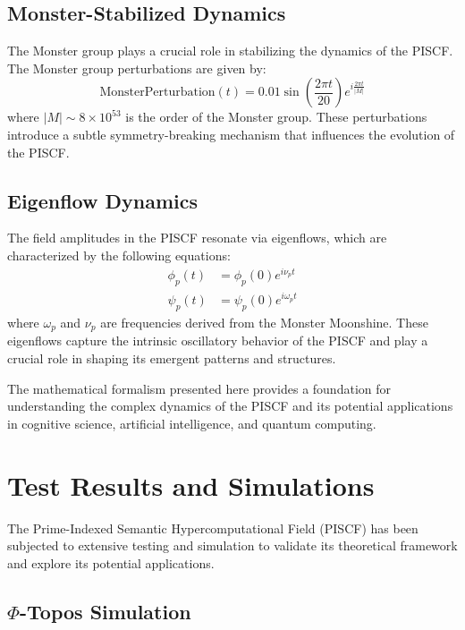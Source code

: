 \documentclass{article}
\theoremstyle{plain}
\begin{document}
\subsection{Monster-Stabilized Dynamics}

The Monster group plays a crucial role in stabilizing the dynamics of the PISCF. The Monster group perturbations are given by:
\begin{equation}
\text{MonsterPerturbation}(t) = 0.01 \sin\left( \frac{2\pi t}{20} \right) e^{i \frac{2\pi t}{|M|}}
\end{equation}
where $|M| \sim 8 \times 10^{53}$ is the order of the Monster group. These perturbations introduce a subtle symmetry-breaking mechanism that influences the evolution of the PISCF.

\subsection{Eigenflow Dynamics}

The field amplitudes in the PISCF resonate via eigenflows, which are characterized by the following equations:
\begin{align}
\phi_p(t) &= \phi_{p}(0) e^{i \nu_p t} \\
\psi_p(t) &= \psi_p(0) e^{i \omega_p t}
\end{align}
where $\omega_p$ and $\nu_p$ are frequencies derived from the Monster Moonshine. These eigenflows capture the intrinsic oscillatory behavior of the PISCF and play a crucial role in shaping its emergent patterns and structures.

The mathematical formalism presented here provides a foundation for understanding the complex dynamics of the PISCF and its potential applications in cognitive science, artificial intelligence, and quantum computing.

\section{Test Results and Simulations}

The Prime-Indexed Semantic Hypercomputational Field (PISCF) has been subjected to extensive testing and simulation to validate its theoretical framework and explore its potential applications.

\subsection{$\Phi$-Topos Simulation}
\end{document}
